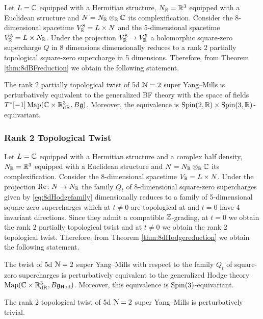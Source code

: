 \documentclass[10pt, oneside]{article}
\newcommand{\Hod}{\mathrm{Hod}}
\renewcommand{\Re}{\mathrm{Re}}
\begin{document}
Let $L = \mathbb C$ equipped with a Hermitian structure, $N_\mathbb R=\mathbb R^3$ equipped with a Euclidean structure and $N=N_\mathbb R\otimes_\mathbb R\mathbb C$ its complexification. Consider the 8-dimensional spacetime $V^8_\mathbb R=L\times N$ and the 5-dimensional spacetime $V^5_\mathbb R=L\times N_\mathbb R$. Under the projection $V^8_\mathbb R\rightarrow V^5_\mathbb R$ a holomorphic square-zero supercharge $Q$ in 8 dimensions dimensionally reduces to a rank $2$ partially topological square-zero supercharge in 5 dimensions. Therefore, from Theorem \ref{thm:8dBFreduction} we obtain the following statement.

\begin{theorem}
The rank $2$ partially topological twist of 5d $\mathcal N=2$ super Yang--Mills is perturbatively equivalent to the generalized BF theory with the space of fields $T^*[-1]\operatorname{Map}(\mathbb C\times \mathbb R^3_{\mathrm{dR}}, B\mathfrak g)$. Moreover, the equivalence is $\mathrm{Spin}(2, \mathbb R)\times\mathrm{Spin}(3, \mathbb R)$-equivariant.
\end{theorem}

\subsubsection{Rank 2 Topological Twist}
\label{sect:5drank2topologicaltwist}

Let $L=\mathbb C$ equipped with a Hermitian structure and a complex half density, $N_\mathbb R=\mathbb R^3$ equipped with a Euclidean structure and $N=N_\mathbb R\otimes_\mathbb R\mathbb C$ its complexification. Consider the 8-dimensional spacetime $V_\mathbb R=L\times N$. Under the projection $\Re\colon N\rightarrow N_\RR$ the family $Q_t$ of 8-dimensional square-zero supercharges given by \eqref{eq:8dHodgefamily} dimensionally reduces to a family of 5-dimensional square-zero supercharges which at $t\neq 0$ are topological at and $t=0$ have 4 invariant directions. Since they admit a compatible $\mathbb Z$-grading, at $t=0$ we obtain the rank 2 partially topological twist and at $t\neq 0$ we obtain the rank 2 topological twist. Therefore, from Theorem \ref{thm:8dHodgereduction} we obtain the following statement.

\begin{theorem}
The twist of 5d $\mathcal N=2$ super Yang--Mills with respect to the family $Q_t$ of square-zero supercharges is perturbatively equivalent to the generalized Hodge theory $\map(\CC\times \RR^3_{\mathrm{dR}}, B\fg_{\Hod})$. Moreover, this equivalence is $\mathrm{Spin}(3)$-equivariant.
\label{thm:5dHodgetwist}
\end{theorem}

\begin{corollary}
The rank 2 topological twist of 5d $\mathcal N=2$ super Yang--Mills is perturbatively trivial.
\label{cor:5drank2topologicaltwist}
\end{corollary}
\end{document}

